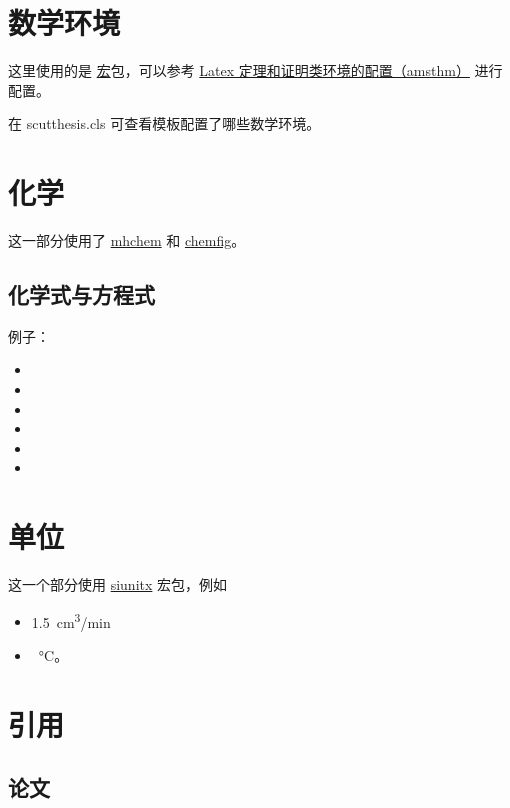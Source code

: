 \section{数学环境}

这里使用的是 \href{https://ctan.org/pkg/amsthm} 宏包，可以参考 \href{https://zhuanlan.zhihu.com/p/133244838}{Latex 定理和证明类环境的配置（amsthm）} 进行配置。

在 scutthesis.cls 可查看模板配置了哪些数学环境。

\section{化学}

这一部分使用了 \href{https://ctan.org/pkg/mhchem}{mhchem} 和 \href{https://ctan.org/pkg/chemfig}{chemfig}。

\subsection{化学式与方程式}

例子：
\begin{itemize}
    \item {}
    \item {}
    \item {}
    \item {}
    \item {}
    \item {}
\end{itemize}

\section{单位}

这一个部分使用 \href{https://ctan.org/pkg/siunitx}{siunitx} 宏包，例如 
\begin{itemize}
    \item \SI{1.5}{cm^3/min}
    \item \SI{}{\degreeCelsius}。
\end{itemize}

\section{引用}

\subsection{论文}

